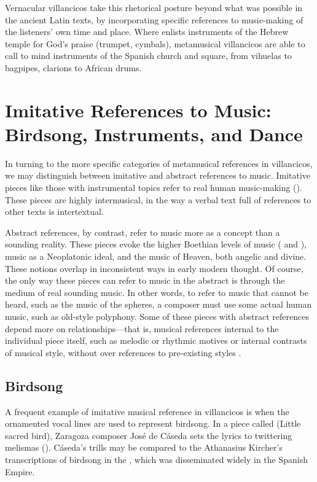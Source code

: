 Vernacular villancicos take this rhetorical posture beyond what was possible in the ancient Latin texts, by incorporating specific references to music-making of the listeners' own time and place.  
Where  enlists instruments of the Hebrew temple for God's praise (trumpet, cymbals), metamusical villancicos are able to call to mind instruments of the Spanish church and square, from vihuelas to bagpipes, clarions to African drums.

\section{Imitative References to Music: Birdsong, Instruments, and Dance}

In turning to the more specific categories of metamusical references in villancicos, we may distinguish between imitative and abstract references to music. 
Imitative pieces like those with instrumental topics refer to real human music-making ().
These pieces are highly intermusical, in the way a verbal text full of references to other texts is intertextual.

Abstract references, by contrast, refer to music more as a concept than a sounding reality.
These pieces evoke the higher Boethian levels of music ( and ), music as a Neoplatonic ideal, and the music of Heaven, both angelic and divine.
These notions overlap in inconsistent ways in early modern thought.
Of course, the only way these pieces can refer to music in the abstract is through the medium of real sounding music.
In other words, to refer to music that cannot be heard, such as the music of the spheres, a composer must use some actual human music, such as old-style polyphony.
Some of these pieces with abstract references depend more on  relationships---that is, musical references internal to the individual piece itself, such as melodic or rhythmic motives or internal contrasts of musical style, without over references to pre-existing styles .

\subsection{Birdsong}

A frequent example of imitative musical reference in villancicos is when the ornamented vocal lines are used to represent birdsong.
In a piece called  (Little sacred bird), Zaragoza composer José de Cáseda sets the lyrics  to twittering melismas ().
Cáseda's trills may be compared to the Athanasius Kircher's transcriptions of birdsong in the , which was disseminated widely in the Spanish Empire.%
  \autocite[30, Iconismus III]{Kircher:Musurgia}

